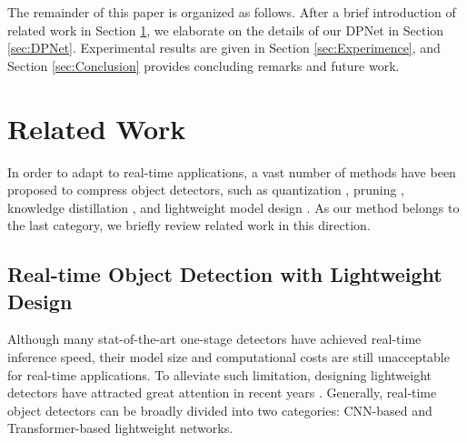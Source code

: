 \documentclass[lettersize,journal]{IEEEtran}
\begin{document}
The remainder of this paper is organized as follows. After a brief introduction of related work in Section \ref{sec:Relatedwork}, we elaborate on the details of our DPNet in Section \ref{sec:DPNet}. Experimental results are given in Section \ref{sec:Experimence}, and Section \ref{sec:Conclusion} provides concluding remarks and future work.

\section{Related Work}\label{sec:Relatedwork}

In order to adapt to real-time applications, a vast number of methods have been proposed to compress object detectors,
such as quantization \cite{wang2021learning}, pruning \cite{han2015learning}, knowledge distillation \cite{dai2021general}, and lightweight model design \cite{Pelee,squeezedet,tang2020lightdet}. As our method belongs to the last category, we briefly review related work in this direction.





\subsection{Real-time Object Detection with Lightweight Design}

Although many stat-of-the-art one-stage detectors \cite{redmon2016you,liu2016ssd,redmon2018yolov3} have achieved real-time inference speed, their model size and computational costs are still unacceptable for real-time applications. To alleviate such limitation, designing lightweight detectors have attracted great attention in recent years \cite{qin2019thundernet,Pelee,squeezedet,tang2020lightdet}. Generally, real‐time object detectors can be broadly divided into two categories: CNN-based \cite{squeezedet,li2018tiny,xiong2021mobiledets} and Transformer-based \cite{mehta2021mobilevit,chen2021mobile} lightweight networks. 
\end{document}
